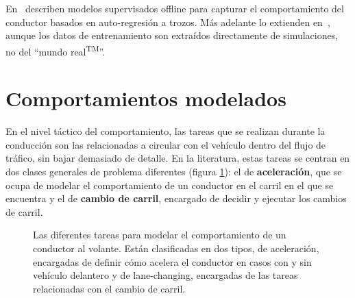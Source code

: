 En~\cite{sekizawa2007modeling} describen modelos supervisados offline para capturar el comportamiento del conductor basados en auto-regresión a trozos. Más adelante lo extienden en~\cite{terada2010multi}, aunque los datos de entrenamiento son extraídos directamente de simulaciones, no del \enquote{mundo real\textsuperscript{TM}}.


\section{Comportamientos modelados}

En el nivel táctico del comportamiento, las tareas que se realizan durante la conducción son las relacionadas a circular con el vehículo dentro del flujo de tráfico, sin bajar demasiado de detalle. En la literatura, estas tareas se centran en dos clases generales de problema diferentes (figura \ref{fig:behavior-model-classification}): el de \textbf{aceleración}, que se ocupa de modelar el comportamiento de un conductor en el carril en el que se encuentra y el de \textbf{cambio de carril}, encargado de decidir y ejecutar los cambios de carril.

\begin{figure}
	\centering
	\caption{Las diferentes tareas para modelar el comportamiento de un conductor al volante. Están clasificadas en dos tipos, de aceleración, encargadas de definir cómo acelera el conductor en casos con y sin vehículo delantero y de lane-changing, encargadas de las tareas relacionadas con el cambio de carril.}
	\label{fig:behavior-model-classification}
\end{figure}

